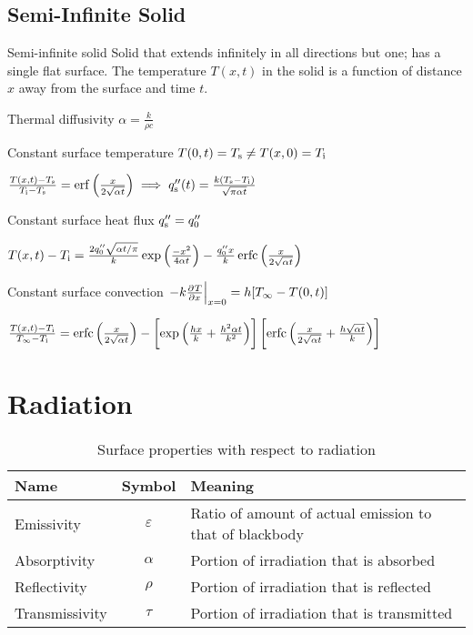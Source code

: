 \documentclass{article}
\begin{document}
\subsection{Semi-Infinite Solid}
\begin{description*}
\item[Semi-infinite solid] Solid that extends infinitely in all directions but one; has a single
  flat surface. The temperature $T(x,t)$ in the solid is a function of distance $x$ away from the
  surface and time $t$.
\item[Thermal diffusivity]
  \(\alpha = \frac{k}{\rho c}\)

\item[Constant surface temperature] \(T(0,t) = T_{\mathrm{s}} \neq T(x,0) = T_{\mathrm{i}}\)

  \(\frac{T(x,t)-T_{\mathrm{s}}}{T_{\mathrm{i}}-T_{\mathrm{s}}}
  = \operatorname{erf}\left(\frac{x}{2\sqrt{\alpha t}}\right)
  \implies q''_{\mathrm{s}}(t) = \frac{k(T_{\mathrm{s}}-T_{\mathrm{i}})}{\sqrt{\pi\alpha t}}\)

\item[Constant surface heat flux] \(q''_{\mathrm{s}} = q''_0\)

  \(T(x,t)-T_{\mathrm{i}}
  = \frac{2q''_0\sqrt{\alpha t/\pi}}{k}\exp\left(\frac{-x^2}{4\alpha t}\right)
  - \frac{q''_0x}{k}\operatorname{erfc}\left(\frac{x}{2\sqrt{\alpha t}}\right)\)

\item[Constant surface convection] \(\left.-k\pd{T}{x}\right|_{x=0} = h[T_\infty-T(0,t)]\)

  \(\frac{T(x,t)-T_{\mathrm{i}}}{T_\infty-T_{\mathrm{i}}}
  = \operatorname{erfc}\left(\frac{x}{2\sqrt{\alpha t}}\right)
  - \left[\exp\left(\frac{hx}{k}+\frac{h^2\alpha t}{k^2}\right)\right]
  \left[\operatorname{erfc}\left(\frac{x}{2\sqrt{\alpha t}}+\frac{h\sqrt{\alpha t}}{k}\right)\right]\)
\end{description*}

\section{Radiation}
\label{sec:radiation}

\begin{table}[htb]
  \centering
  \caption{Surface properties with respect to radiation}\label{tab:radiation-props}
  \begin{tabu}{lcl}
    \toprule
    Name & Symbol & Meaning \\
    \midrule
    Emissivity & $\varepsilon$ & Ratio of amount of actual emission to that of blackbody \\
    Absorptivity & $\alpha$ & Portion of irradiation that is absorbed \\
    Reflectivity & $\rho$ & Portion of irradiation that is reflected \\
    Transmissivity & $\tau$ & Portion of irradiation that is transmitted \\
    \bottomrule
  \end{tabu}
\end{table}
\end{document}
